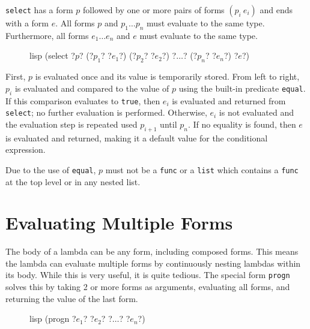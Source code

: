 \documentclass[a4paper, 12pt]{article}
\begin{document}
\texttt{select} has a form $p$ followed by one or more pairs of forms $(p_i\ e_i)$ and ends with a form $e$. All forms $p$ and $p_1 \ldots p_n$ must evaluate to the same type. Furthermore, all forms $e_1 \ldots e_n$ and $e$ must evaluate to the same type.

\begin{figure}[htp]
    \centering
    \begin{cminted}[autogobble=true, escapeinside=??]{lisp}
        (select ?$p$? (?$p_1$? ?$e_1$?) (?$p_2$? ?$e_2$?) ?$\ldots$? (?$p_n$? ?$e_n$?) ?$e$?)
    \end{cminted}
    \captionsetup[figure]{font=small}
\end{figure}

First, $p$ is evaluated once and its value is temporarily stored. From left to right, $p_i$ is evaluated and compared to the value of $p$ using the built-in predicate \texttt{equal}. If this comparison evaluates to \texttt{true}, then $e_i$ is evaluated and returned from \texttt{select}; no further evaluation is performed. Otherwise, $e_i$ is not evaluated and the evaluation step is repeated used $p_{i + 1}$ until $p_n$. If no equality is found, then $e$ is evaluated and returned, making it a default value for the conditional expression.

Due to the use of \texttt{equal}, $p$ must not be a \texttt{func} or a \texttt{list} which contains a \texttt{func} at the top level or in any nested list.

\section{Evaluating Multiple Forms}
The body of a lambda can be any form, including composed forms. This means the lambda can evaluate multiple forms by continuously nesting lambdas within its body. While this is very useful, it is quite tedious. The special form \texttt{progn} solves this by taking 2 or more forms as arguments, evaluating all forms, and returning the value of the last form.

\begin{figure}[htp]
    \centering
    \begin{cminted}[autogobble=true, escapeinside=??]{lisp}
        (progn ?$e_1$? ?$e_2$? ?$\ldots$? ?$e_n$?)
    \end{cminted}
    \captionsetup[figure]{font=small}
\end{figure}
\end{document}
